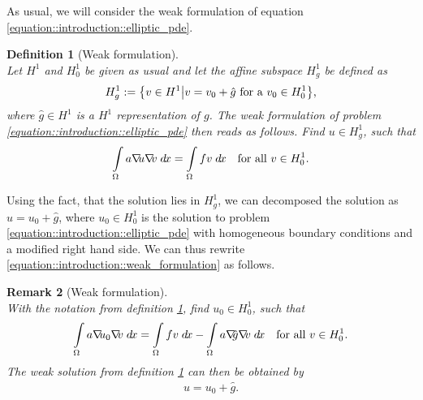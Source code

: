 \documentclass[a4paper,11pt]{article}
\numberwithin{equation}{section}
\newtheorem{definition}{Definition}[section]
\newtheorem{remark}[definition]{Remark}
\newcommand{\theoremNewline}{\hspace{1mm}\\}
\newcommand{\theoremEndLine}{\hspace{1mm}}
\newcommand{\hnS}{\hspace{-1.25pt}}
\newcommand{\gradient}{\nabla\hnS\hnS}
\newcommand{\dx}{\;d\hnS x}
\newcommand{\komma}{\text{,}}
\newcommand{\punkt}{\text{.}}
\begin{document}
    As usual, we will consider the weak formulation of equation \ref{equation::introduction::elliptic_pde}.

    \begin{definition}[Weak formulation]\theoremNewline
      \label{definition::introduction::weak_formulation}
      Let $H^1$ and $H^1_0$ be given as usual and let the affine subspace $H^1_g$ be
      defined as
      \begin{align}
        H^1_g :=
          \big\{
            v \in H^1
          \big|
            v = v_0 + \hat{g} \text{ for a } v_0 \in H^1_0
          \big\}\komma
        \notag
      \end{align}
      where ${\hat{g} \in H^{1}}$ is a ${H^{1}}$ representation of $g$.
      The weak formulation of problem \eqref{equation::introduction::elliptic_pde} then reads as follows. Find
      ${u \in H^1_g}$, such that
      \begin{align}
        \label{equation::introduction::weak_formulation}
        \int\limits_{\Omega}
          a \gradient u \gradient v
        \dx
        =
        \int\limits_{\Omega}
          f v
        \dx
        &&\text{for all } v \in H^1_0 \punkt
      \end{align}
    \end{definition}\theoremEndLine

    Using the fact, that the solution lies in ${H_g^1}$, we can decomposed the solution as ${u = u_0 + \hat{g}}$, where
    ${u_0 \in H_0^1}$ is the solution to problem \eqref{equation::introduction::elliptic_pde} with homogeneous boundary
    conditions and a modified right hand side. We can thus rewrite \eqref{equation::introduction::weak_formulation} as follows.

    \begin{remark}[Weak formulation]\theoremNewline
      \label{remark::introduction::weak_formulation}
      With the notation from definition \ref{definition::introduction::weak_formulation}, find ${u_0 \in H_0^1}$, such
      that
      \begin{align}
        \label{equation::introduction::weak_formulation_homogeneous_boundary_values}
        \int\limits_{\Omega}
          a \gradient u_0 \gradient v
        \dx
        =
        \int\limits_{\Omega}
          f v
        \dx -
        \int\limits_{\Omega}
          a \gradient \hat{g} \gradient v
        \dx
        &&\text{for all } v \in H^1_0 \punkt
      \end{align}
      The weak solution from definition \ref{definition::introduction::weak_formulation} can then be obtained by
      \begin{align}
        \label{equation::introduction::weak_formulation_decomposition_solution}
        u = u_0 + \hat{g} \punkt
      \end{align}
    \end{remark}\theoremEndLine
\end{document}
